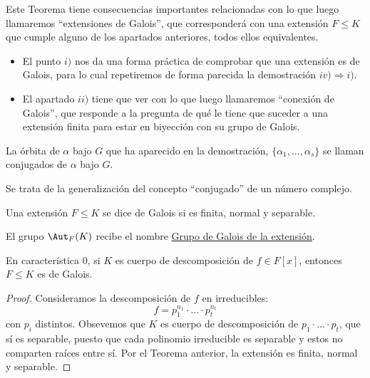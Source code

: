 \noindent
Este Teorema tiene consecuencias importantes relacionadas con lo que luego llamaremos ``extensiones de Galois'', que corresponderá con una extensión $F\leq K$ que cumple alguno de los apartados anteriores, todos ellos equivalentes.
\begin{itemize}
    \item El punto $i)$ nos da una forma práctica de comprobar que una extensión es de Galois, para lo cual repetiremos de forma parecida la demostración $iv)\Longrightarrow i)$.
    \item El apartado $ii)$ tiene que ver con lo que luego llamaremos ``conexión de Galois'', que responde a la pregunta de qué le tiene que suceder a una extensión finita para estar en biyección con su grupo de Galois.
\end{itemize}

\begin{definicion}
    La órbita de $\alpha$ bajo $G$ que ha aparecido en la demostración, $\{\alpha_1, \ldots, \alpha_s\}$ se llaman conjugados de $\alpha$ bajo $G$.
\end{definicion}

\noindent
Se trata de la generalización del concepto ``conjugado'' de un número complejo.

\begin{definicion}
    Una extensión $F\leq K$ se dice de Galois si es finita, normal y separable.

    \noindent
    El grupo $\Aut_F(K)$ recibe el nombre \underline{Grupo de Galois de la extensión}.
\end{definicion}

\begin{coro}
    En característica $0$, si $K$ es cuerpo de descomposición de $f\in F[x]$, entonces $F\leq K$ es de Galois.
    \begin{proof}
        Consideramos la descomposición de $f$ en irreducibles:
        \begin{equation*}
            f = p_1^{n_1}\cdot \ldots \cdot p_t^{n_t}
        \end{equation*}
        con $p_i$ distintos. Obsevemos que $K$ es cuerpo de descomposición de $p_1\cdot \ldots\cdot p_t$, que sí es separable, puesto que cada polinomio irreducible es separable y estos no comparten raíces entre sí. Por el Teorema anterior, la extensión es finita, normal y separable.
    \end{proof}
\end{coro}

